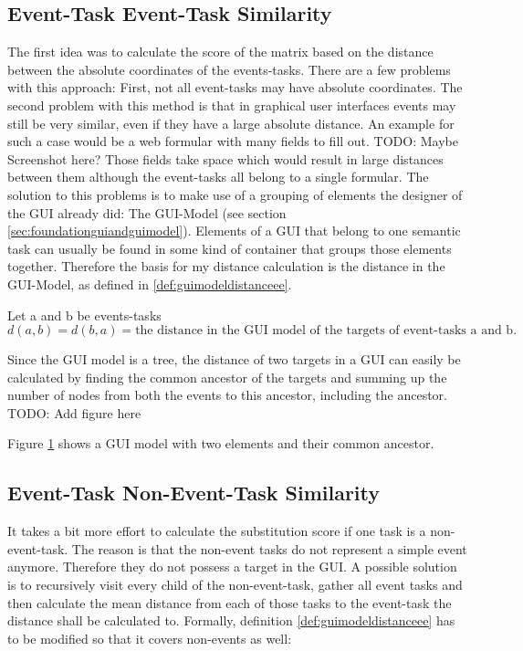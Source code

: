 \subsection{Event-Task Event-Task Similarity}
The first idea was to calculate the score of the matrix based on the distance between the absolute coordinates of the events-tasks. 
There are a few problems with this approach: First, not all event-tasks may have absolute coordinates. 
The second problem with this method is that in graphical user interfaces events may still be very similar, even if they have a large absolute distance.
An example for such a case would be a web formular with many fields to fill out. 
TODO: Maybe Screenshot here?
Those fields take space which would result in large distances between them although the event-tasks all belong to a single formular.
The solution to this problems is to make use of a grouping of elements the designer of the GUI already did: The GUI-Model (see section \ref{sec:foundationguiandguimodel}).
Elements of a GUI that belong to one semantic task can usually be found in some kind of container that groups those elements together. Therefore the basis for my 
distance calculation is the distance in the GUI-Model, as defined in \ref{def:guimodeldistanceee}. 

\begin{definition}
	\item Let a and b be events-tasks
\begin{equation*}d(a,b) = d(b,a) = \text{the distance in the GUI model of the targets of event-tasks a and b.}
\end{equation*}
\label{def:guimodeldistanceee}
\end{definition}

Since the GUI model is a tree, the distance of two targets in a GUI can easily be calculated by finding the common ancestor of the targets and summing up the number of nodes from both the events to this ancestor, including the ancestor.
TODO: Add figure here
\begin{figure}[h]
	\label{fig:guimodeldistance}
\end{figure}
Figure \ref{fig:guimodeldistance} shows a GUI model with two elements and their common ancestor. 


\subsection{Event-Task Non-Event-Task Similarity}
It takes a bit more effort to calculate the substitution score if one task is a non-event-task. 
The reason is that the non-event tasks do not represent a simple event anymore. Therefore they do not possess a target in the GUI.
A possible solution is to recursively visit every child of the non-event-task, gather all event tasks and then calculate the mean distance from each of those tasks to the event-task the distance shall be calculated to.
Formally, definition \ref{def:guimodeldistanceee} has to be modified so that it covers non-events as well:

